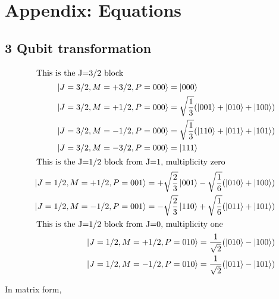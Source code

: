 \appendix
\section{Appendix: Equations}

\subsection{3 Qubit transformation}

\begin{subequations}
\begin{align}
\intertext{ This is the J=3/2 block}
\begin{split}
&\left\vert{J=3/2, M=+3/2, P=000}\right\rangle = \left\vert{000}\right\rangle \\
&\left\vert{J=3/2, M=+1/2, P=000}\right\rangle = \sqrt{\frac{1}{3}}(\left\vert{001}\right\rangle+\left\vert{010}\right\rangle+\left\vert{100}\right\rangle) \\
&\left\vert{J=3/2, M=-1/2, P=000}\right\rangle = \sqrt{\frac{1}{3}}(\left\vert{110}\right\rangle+\left\vert{011}\right\rangle+\left\vert{101}\right\rangle) \\
&\left\vert{J=3/2, M=-3/2, P=000}\right\rangle = \left\vert{111}\right\rangle \\ 
\end{split} \\
\intertext{ This is the J=1/2 block from J=1, multiplicity zero}
\begin{split}
&\left\vert{J=1/2, M=+1/2, P=001}\right\rangle =+\sqrt{\frac{2}{3}}\left\vert{001}\right\rangle - \sqrt{\frac{1}{6}}(\left\vert{010}\right\rangle+\left\vert{100}\right\rangle) \\
&\left\vert{J=1/2, M=-1/2, P=001}\right\rangle =-\sqrt{\frac{2}{3}}\left\vert{110}\right\rangle + \sqrt{\frac{1}{6}}(\left\vert{011}\right\rangle+\left\vert{101}\right\rangle) \\ 
\end{split} \\
\intertext{ This is the J=1/2 block from J=0, multiplicity one}
\begin{split}
&\left\vert{J=1/2, M=+1/2, P=010}\right\rangle = \frac{1}{\sqrt{2}} (\left\vert{010}\right\rangle-\left\vert{100}\right\rangle)\\
&\left\vert{J=1/2, M=-1/2, P=010}\right\rangle = \frac{1}{\sqrt{2}} (\left\vert{011}\right\rangle-\left\vert{101}\right\rangle)\\
\end{split} 
\label{eq:3cgcoeff}
\end{align}
\end{subequations}

In matrix form,

